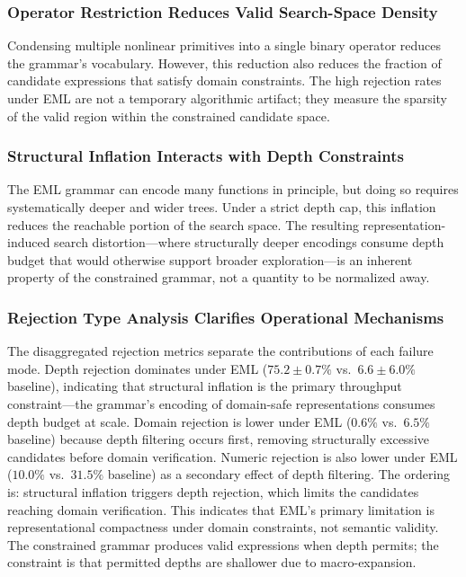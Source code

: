 \documentclass[runningheads]{llncs}
\begin{document}
\subsubsection{Operator Restriction Reduces Valid Search-Space Density}
Condensing multiple nonlinear primitives into a single binary operator reduces the grammar's vocabulary. However, this reduction also reduces the fraction of candidate expressions that satisfy domain constraints. The high rejection rates under EML are not a temporary algorithmic artifact; they measure the sparsity of the valid region within the constrained candidate space.

\subsubsection{Structural Inflation Interacts with Depth Constraints}
The EML grammar can encode many functions in principle, but doing so
requires systematically deeper and wider trees. Under a strict depth cap,
this inflation reduces the reachable portion of the search space. The
resulting representation-induced search distortion---where structurally
deeper encodings consume depth budget that would otherwise support
broader exploration---is an inherent property of the constrained grammar,
not a quantity to be normalized away.

\subsubsection{Rejection Type Analysis Clarifies Operational Mechanisms}
The disaggregated rejection metrics separate the contributions of each failure mode. Depth rejection dominates under EML ($75.2\pm0.7\%$ vs.~$6.6\pm6.0\%$ baseline), indicating that structural inflation is the primary throughput constraint---the grammar's encoding of domain-safe representations consumes depth budget at scale. Domain rejection is lower under EML ($0.6\%$ vs.~$6.5\%$ baseline) because depth filtering occurs first, removing structurally excessive candidates before domain verification. Numeric rejection is also lower under EML ($10.0\%$ vs.~$31.5\%$ baseline) as a secondary effect of depth filtering. The ordering is: structural inflation triggers depth rejection, which limits the candidates reaching domain verification. This indicates that EML's primary limitation is representational compactness under domain constraints, not semantic validity. The constrained grammar produces valid expressions when depth permits; the constraint is that permitted depths are shallower due to macro-expansion.
\end{document}
